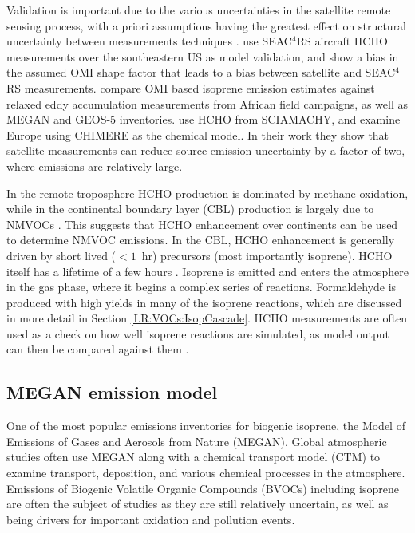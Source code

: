     
    Validation is important due to the various uncertainties in the satellite remote sensing process, with a priori assumptions having the greatest effect on structural uncertainty between measurements techniques \textcite{Lorente2017}.
    \textcite{Zhu2016} use SEAC$^4$RS aircraft HCHO measurements over the southeastern US as model validation, and show a bias in the assumed OMI shape factor that leads to a bias between satellite and SEAC$^4$RS measurements.
    \textcite{Marais2014} compare OMI based isoprene emission estimates against relaxed eddy accumulation measurements from African field campaigns, as well as MEGAN and GEOS-5 inventories.
    \textcite{Dufour2009} use HCHO from SCIAMACHY, and examine Europe using CHIMERE as the chemical model. 
    In their work they show that satellite measurements can reduce source emission uncertainty by a factor of two, where emissions are relatively large.
    
    In the remote troposphere HCHO production is dominated by methane oxidation, while in the continental boundary layer (CBL) production is largely due to NMVOCs \parencite{Abbot2003, Kefauver2014}.
    This suggests that HCHO enhancement over continents can be used to determine NMVOC emissions.
    In the CBL, HCHO enhancement is generally driven by short lived ($<1$~hr) precursors (most importantly isoprene).
    HCHO itself has a lifetime of a few hours \parencite{Kefauver2014}.
    Isoprene is emitted and enters the atmosphere in the gas phase, where it begins a complex series of reactions.
    Formaldehyde is produced with high yields in many of the isoprene reactions, which are discussed in more detail in Section \ref{LR:VOCs:IsopCascade}.
    HCHO measurements are often used as a check on how well isoprene reactions are simulated, as model output can then be compared against them \parencite{Marvin2017}.
  
  \subsection{MEGAN emission model}
    One of the most popular emissions inventories for biogenic isoprene, the Model of Emissions of Gases and Aerosols from Nature (MEGAN).
    Global atmospheric studies often use MEGAN along with a chemical transport model (CTM) to examine transport, deposition, and various chemical processes in the atmosphere.
    Emissions of Biogenic Volatile Organic Compounds (BVOCs) including isoprene are often the subject of studies as they are still relatively uncertain, as well as being drivers for important oxidation and pollution events.
    
